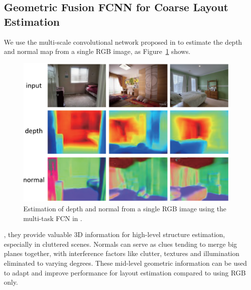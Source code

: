  


\subsection{Geometric Fusion FCNN for Coarse Layout Estimation}
\label{sec:depth_normal}

We use the multi-scale convolutional network proposed in \cite{eigen2015predicting} to estimate the depth and normal map from a single RGB image, as Figure~\ref{fig:depthandnormal} shows. 
%


\begin{figure}
	\centering
	\includegraphics[width=\columnwidth]{figure/geometricinfo1.png}
	\caption{Estimation of depth and normal from a single RGB image using the multi-task FCN in \cite{eigen2015predicting}.}
	\label{fig:depthandnormal}
\end{figure}

, they provide valuable 3D information for high-level structure estimation, especially in cluttered scenes.
%
Normals can serve as clues tending to merge big planes together, with interference factors like clutter, textures and illumination eliminated to varying degrees. 
%
These mid-level geometric information can be used to adapt and improve performance for layout estimation compared to using RGB only. 



